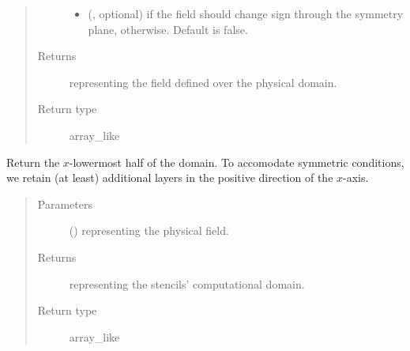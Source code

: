 \documentclass[letterpaper,10pt,english]{sphinxmanual}
\begin{document}
\begin{fulllineitems}
\begin{fulllineitems}
\begin{quote}
\begin{description}
\begin{itemize}
\item {} 
 (, optional) \textendash{}  if the field should change sign through the symmetry plane,  otherwise.
Default is false.

\end{itemize}

\item[{Returns}] \leavevmode
{} representing the field defined over the physical domain.

\item[{Return type}] \leavevmode
array\_like

\end{description}\end{quote}

\end{fulllineitems}


\begin{fulllineitems}
\label{\detokenize{api:dycore.horizontal_boundary_relaxed.RelaxedSymmetricYZ.from_physical_to_computational_domain}}
Return the \(x\)-lowermost half of the domain. To accomodate symmetric conditions,
we retain (at least)  additional layers in the positive direction of the \(x\)-axis.
\begin{quote}\begin{description}
\item[{Parameters}] \leavevmode
{} () \textendash{}  representing the physical field.

\item[{Returns}] \leavevmode
{} representing the stencils’ computational domain.

\item[{Return type}] \leavevmode
array\_like


\end{description}
\end{quote}
\end{fulllineitems}
\end{fulllineitems}
\end{document}
